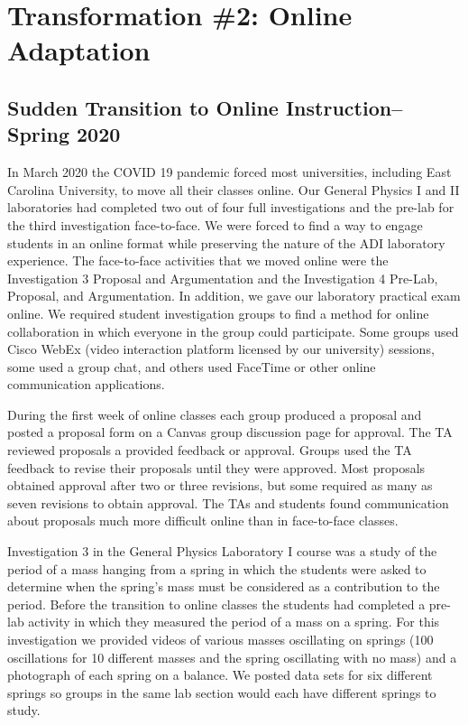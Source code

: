 \documentclass[aip, preprint, numerical]{revtex4-2}
\begin{document}
\setcounter{section}{3}
\section{Transformation \#2: Online Adaptation}

\subsection{Sudden Transition to Online Instruction--Spring 2020}

In March 2020 the COVID 19 pandemic forced most universities, including East Carolina University, to move all their classes online. Our General Physics I and II laboratories had completed two out of four full investigations and the pre-lab for the third investigation face-to-face. We were forced to find a way to engage students in an online format while preserving the nature of the ADI laboratory experience. The face-to-face activities that we moved online were the Investigation 3 Proposal and Argumentation and the Investigation 4 Pre-Lab, Proposal, and Argumentation. In addition, we gave our laboratory practical exam online. We required student investigation groups to find a method for online collaboration in which everyone in the group could participate. Some groups used Cisco WebEx (video interaction platform licensed by our university) sessions, some used a group chat, and others used FaceTime or other online communication applications. 

During the first week of online classes each group produced a proposal and posted a proposal form on a Canvas group discussion page for approval. The TA reviewed proposals a provided feedback or approval. Groups used the TA feedback to revise their proposals until they were approved. Most proposals obtained approval after two or three revisions, but some required as many as seven revisions to obtain approval. The TAs and students found communication about proposals much more difficult online than in face-to-face classes. 

Investigation 3 in the General Physics Laboratory I course was a study of the period of a mass hanging from a spring in which the students were asked to determine when the spring's mass must be considered as a contribution to the period. Before the transition to online classes the students had completed a pre-lab activity in which they measured the period of a mass on a spring. For this investigation we provided videos of various masses oscillating on springs (100 oscillations for 10 different masses and the spring oscillating with no mass) and a photograph of each spring on a balance. We posted data sets for six different springs so groups in the same lab section would each have different springs to study. 
\end{document}
